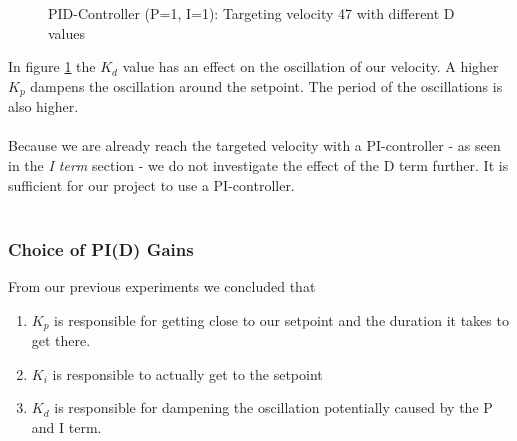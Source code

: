 \begin{figure}[H]
    \centering
{}
    \caption{PID-Controller (P=1, I=1): Targeting velocity 47 with different D values} \label{fig:D_demo}
\end{figure}

In figure \ref{fig:D_demo} the $K_d$ value has an effect on the oscillation of our velocity. A higher $K_p$ dampens the oscillation around the setpoint. The period of the oscillations is also higher.\\\\
Because we are already reach the targeted velocity with a PI-controller - as seen in the \textit{I term} section - we do not investigate the effect of the D term further. It is sufficient for our project to use a PI-controller.\\\\

\subsubsection{Choice of PI(D) Gains}
From our previous experiments we concluded that
\begin{enumerate}
    \item $K_p$ is responsible for getting close to our setpoint and the duration it takes to get there.
    \item $K_i$ is responsible to actually get to the setpoint
    \item $K_d$ is responsible for dampening the oscillation potentially caused by the P and I term.
\end{enumerate}


